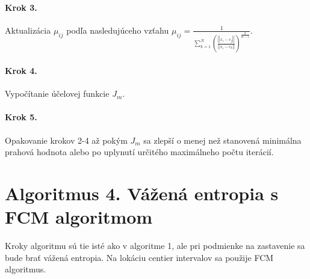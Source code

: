 \paragraph{Krok 3.} Aktualizácia $\mu_{ij}$ podľa nasledujúceho vzťahu  
$\mu_{ij} = \frac{1}{\sum\limits_{k=1}^N  \left ( \frac {\left| \left| x_i - c_j \right|\right|}{\left| \left| x_i -c_k\right|\right|}\right) ^{\frac{2}{m-1}}}. $


\paragraph{Krok 4.} Vypočítanie účelovej funkcie $J_m$. 
\paragraph{Krok 5.} Opakovanie krokov 2-4 až pokým $J_m$ sa zlepší o menej než stanovená minimálna prahová hodnota alebo po uplynutí určitého maximálneho počtu iterácií. 



\section{Algoritmus 4. Vážená entropia s FCM algoritmom}

Kroky algoritmu sú tie isté ako v algoritme 1, ale pri podmienke na zastavenie sa bude brať vážená entropia. Na lokáciu centier intervalov sa použije FCM algoritmus.  

